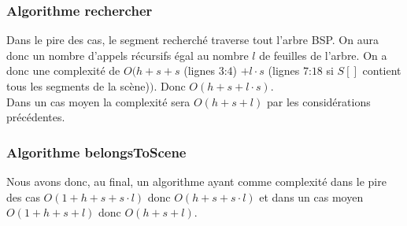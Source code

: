 \documentclass[10pt]{article}
\begin{document}
\subsubsection{Algorithme rechercher}
Dans le pire des cas, le segment recherché traverse tout l'arbre BSP. On aura donc un nombre d'appels récursifs égal au nombre $l$ de feuilles de l'arbre. On a donc une complexité de $O(h+s+s$ (lignes $3$:$4$) $+ l\cdot s$ (lignes $7$:$18$ si $S[]$ contient tous les segments de la scène)$)$. Donc $O(h+s+l\cdot s)$.\\[.5cm]
Dans un cas moyen la complexité sera $O(h+s+l)$ par les considérations précédentes.
\subsubsection{Algorithme belongsToScene}
Nous avons donc, au final, un algorithme ayant comme complexité dans le pire des cas $O(1+h+s+s\cdot l)$ donc $O(h+s+s\cdot l)$ et dans un cas moyen $O(1+h+s+l)$ donc $O(h+s+l)$.
\end{document}
